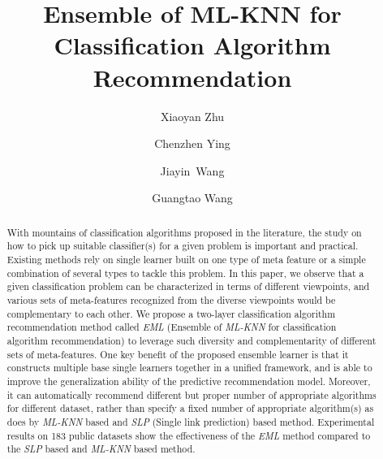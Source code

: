 \documentclass[review,3p,twocolumn,times]{elsarticle}
\begin{document}
\begin{frontmatter}

\title{Ensemble of ML-KNN for Classification Algorithm Recommendation}


\author[xjtuaddress]{Xiaoyan Zhu}

\author[xjtuaddress]{Chenzhen Ying}

\author[xjtuaddress]{Jiayin~Wang}

\author[michaddress]{Guangtao Wang}


\address[xjtuaddress]{School of Electronic and Information Engineering,
	Xi$'$an Jiaotong University, Xi$'$an, China}
\address[michaddress]{JD AI Research, Mountain View, California}
%
%

\begin{abstract}
 With mountains of classification algorithms proposed in the literature, the study on how to pick up suitable classifier(s) for a given problem is important and practical. Existing methods rely on single learner built on one type of meta feature or a simple combination of several types to tackle this problem. In this paper, we observe that a given classification problem can be characterized in terms of different viewpoints, and various sets of meta-features recognized from the diverse viewpoints would be complementary to each other. We propose a two-layer classification algorithm recommendation method called \emph{EML} (Ensemble of \emph{ML-KNN} for classification algorithm recommendation) to leverage such diversity and complementarity of different sets of meta-features. One key benefit of the proposed ensemble learner is that it constructs multiple base single learners together in a unified framework, and is able to improve the generalization ability of the predictive recommendation model. Moreover, it can automatically recommend different but proper number of appropriate algorithms for different dataset, rather than specify a fixed number of appropriate algorithm(s) as does by \emph{ML-KNN} based and \emph{SLP} (Single link prediction) based method. Experimental results on 183 public datasets show the effectiveness of the \emph{EML} method compared to the \emph{SLP} based and \emph{ML-KNN} based method.
\end{abstract}


\end{frontmatter}
\end{document}
